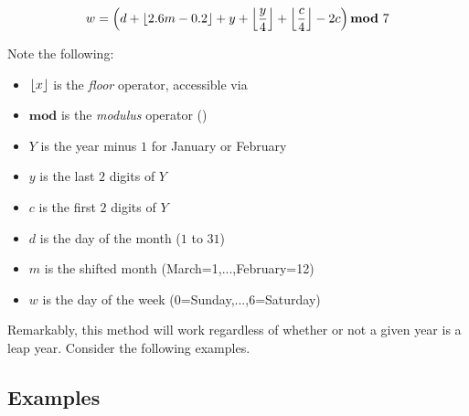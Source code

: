 		\[
			w = \left(d + \floor{2.6m - 0.2} + y + \floor{\dfrac{y}{4}} + \floor{\dfrac{c}{4}} - 2c\right) \mathbf{mod}\ 7
		\]

		Note the following:
		\begin{itemize}
			\item $\left\lfloor x \right\rfloor$ is the \emph{floor} operator, accessible via 
			\item $\mathbf{mod}$ is the \emph{modulus} operator (\code{\%})
			\item $Y$ is the year minus $1$ for January or February
			\item $y$ is the last $2$ digits of $Y$
			\item $c$ is the first $2$ digits of $Y$
			\item $d$ is the day of the month ($1$ to $31$)
			\item $m$ is the shifted month (March=1,...,February=12)
			\item $w$ is the day of the week (0=Sunday,...,6=Saturday)
		\end{itemize}

		Remarkably, this method will work regardless of whether or not a given year is a leap year. Consider the following examples.

		\subsection{Examples}
			\ \\[18pt]
			\ \\[18pt]

	\pagebreak

